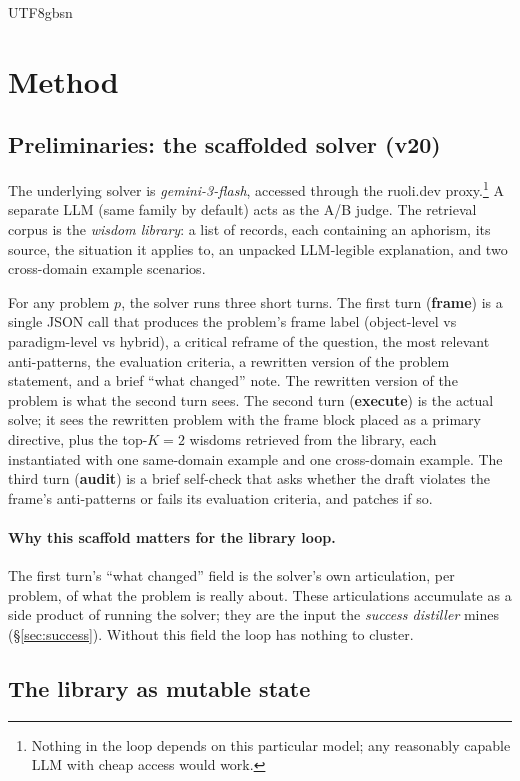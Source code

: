 \documentclass{article}
\begin{document}
\begin{CJK*}{UTF8}{gbsn}
\section{Method}
\label{sec:method}

\subsection{Preliminaries: the scaffolded solver (v20)}
\label{sec:solver}

The underlying solver is \emph{gemini-3-flash}, accessed through
the ruoli.dev proxy.\footnote{Nothing in the loop depends on this
particular model; any reasonably capable LLM with cheap access
would work.} A separate LLM (same family by default) acts as the
A/B judge. The retrieval corpus is the \emph{wisdom library}: a
list of records, each containing an aphorism, its source, the
situation it applies to, an unpacked LLM-legible explanation, and
two cross-domain example scenarios.

For any problem \(p\), the solver runs three short turns. The
first turn (\textbf{frame}) is a single JSON call that produces
the problem's frame label (object-level vs paradigm-level vs
hybrid), a critical reframe of the question, the most relevant
anti-patterns, the evaluation criteria, a rewritten version of
the problem statement, and a brief ``what changed'' note. The
rewritten version of the problem is what the second turn sees.
The second turn (\textbf{execute}) is the actual solve; it sees
the rewritten problem with the frame block placed as a primary
directive, plus the top-\(K{=}2\) wisdoms retrieved from the
library, each instantiated with one same-domain example and one
cross-domain example. The third turn (\textbf{audit}) is a brief
self-check that asks whether the draft violates the frame's
anti-patterns or fails its evaluation criteria, and patches if
so.

\paragraph{Why this scaffold matters for the library loop.}
The first turn's ``what changed'' field is the solver's own
articulation, per problem, of what the problem is really about.
These articulations accumulate as a side product of running the
solver; they are the input the \emph{success distiller} mines
(\S\ref{sec:success}). Without this field the loop has nothing
to cluster.

\subsection{The library as mutable state}
\label{sec:registry}


\end{CJK*}
\end{document}
